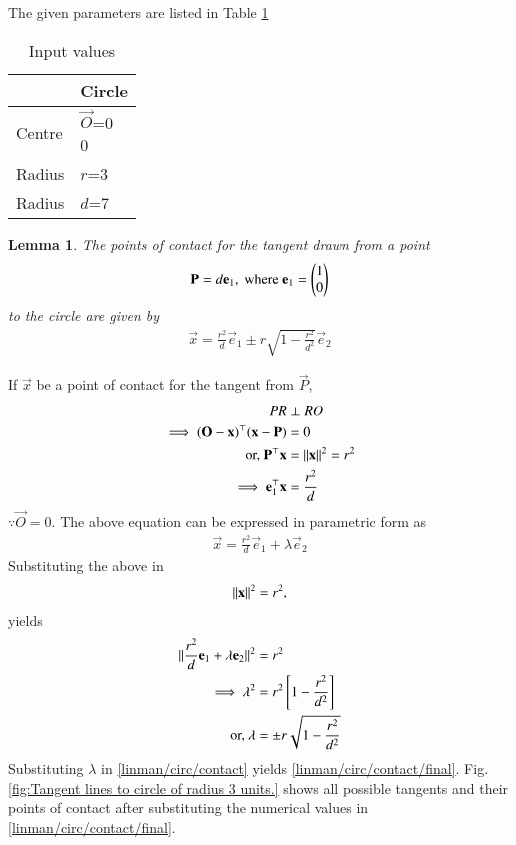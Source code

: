 \documentclass[journal,12pt,twocolumn]{IEEEtran}
\newtheorem{lemma}{Lemma}
\begin{document}
The given parameters are listed in Table \ref{tab:table1}
%
\begin{table}[!ht]
\begin{center}
\begin{tabular}{ | m{2cm} | m{2cm} |} 
\hline
 & Circle \\
\hline
Centre  & $\vec{O}$=\myvec{0\\0} \\ 
\hline
Radius & $r$=3  \\ 
\hline
Radius & $d$=7  \\ 
\hline
\end{tabular}
\end{center}
\caption{Input values}
\label{tab:table1}
\end{table}
%
\begin{lemma}
  \label{lemma/linman/circ/contact/final}
  The points of contact for the tangent drawn from a point 
%
\begin{align}
  \mathbf{P} = d\mathbf{e}_1, \text{ where } \mathbf{e}_1 = \begin{pmatrix}1\\0\end{pmatrix}
  \end{align}
  to the circle are given by 
  \begin{align}
    \vec{x} = \frac{r^2}{d}\vec{e}_1  \pm r\sqrt{1 - \frac{r^2}{d^2}} \vec{e}_2
    \label{linman/circ/contact/final}
   \end{align}
%   
\end{lemma}
If $\vec{x}$ be a point of contact for the tangent from $\vec{P}$, 
\begin{align}
PR &\perp RO
\\
 \implies (\mathbf{O}-\mathbf{x})^{\top} (\mathbf{x}-\mathbf{P}) &= 0
 \\
 \text{or, }  \mathbf{P}^{\top} \mathbf{x} &=\lVert\mathbf{x}\rVert^2 = r^2
 \\
 \implies \mathbf{e}_1^{\top} \mathbf{x} &= \frac{r^2}{d}
  \end{align}
  $\because \vec{O} = 0$.  The above equation can be expressed in parametric form as 
 \begin{align}
  \vec{x} = \frac{r^2}{d}\vec{e}_1 + \lambda \vec{e}_2
  \label{linman/circ/contact}
 \end{align}
 Substituting the above in 
 \begin{align}
  \lVert\mathbf{x}\rVert^2 = r^2,
 \end{align}
 yields
\begin{align}
\lVert\frac{r^2}{d}\mathbf{e}_1 + \lambda \mathbf{e}_2\rVert^2&=r^2
\\
\implies \lambda^2 &= r^2{}\left[1 - \frac{r^2}{d^2}\right]
\\
\text{or, }\lambda &= \pm r\sqrt{1 - \frac{r^2}{d^2}}
\end{align}
%
Substituting $\lambda $ in \eqref{linman/circ/contact} yields \eqref{linman/circ/contact/final}.  Fig.  \ref{fig:Tangent lines to circle of radius 3 units.} shows all possible tangents
and their points of contact after substituting the numerical values in \eqref{linman/circ/contact/final}.
%
\end{document}
